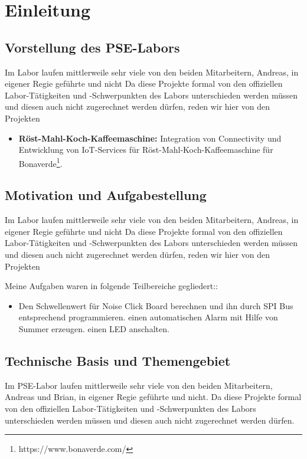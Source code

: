 \chapter{Einleitung}
\label{sec:intro}
\section{Vorstellung des PSE-Labors}
\label{sec:intro:about_lab}
Im Labor laufen mittlerweile sehr viele von den beiden Mitarbeitern, Andreas, in eigener Regie geführte und nicht Da diese Projekte formal von den offiziellen Labor-Tätigkeiten und -Schwerpunkten des Labors unterschieden werden müssen und diesen auch nicht zugerechnet werden dürfen, reden wir hier von den Projekten

\begin{itemize}
	\item \textbf{Röst-Mahl-Koch-Kaffeemaschine:} Integration von Connectivity und Entwicklung von IoT-Services für Röst-Mahl-Koch-Kaffeemaschine für Bonaverde\footnote{https://www.bonaverde.com/}. 
\end{itemize}  

\section{Motivation und Aufgabestellung}
\label{sec:intro:motivation}
Im Labor laufen mittlerweile sehr viele von den beiden Mitarbeitern, Andreas, in eigener Regie geführte und nicht Da diese Projekte formal von den offiziellen Labor-Tätigkeiten und -Schwerpunkten des Labors unterschieden werden müssen und diesen auch nicht zugerechnet werden dürfen, reden wir hier von den Projekten

Meine Aufgaben waren in folgende Teilbereiche gegliedert:: 
\begin{itemize}
	\item Den Schwellenwert für Noise Click Board berechnen und ihn durch SPI Bus entsprechend programmieren. 
	\subitem * einen automatischen Alarm mit Hilfe von Summer erzeugen.
	\subitem * einen LED anschalten.
\end{itemize}

\section{Technische Basis und Themengebiet}
\label{sec:intro:themengebiet}
Im PSE-Labor laufen mittlerweile sehr viele von den beiden Mitarbeitern, Andreas und Brian, in eigener Regie geführte und nicht. Da diese Projekte formal von den offiziellen Labor-Tätigkeiten und -Schwerpunkten des Labors unterschieden werden müssen und diesen auch nicht zugerechnet werden dürfen.